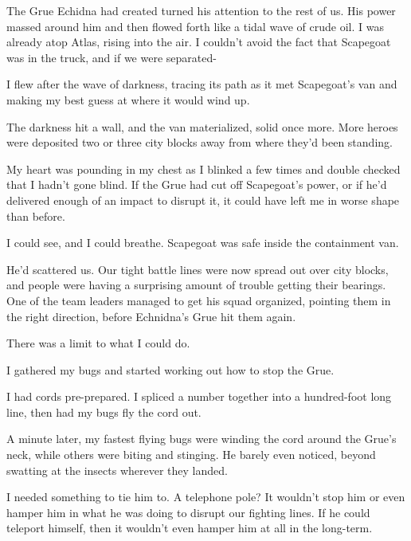 





The Grue Echidna had created turned his attention to the rest of us.  His power massed around him and then flowed forth like a tidal wave of crude oil.  I was already atop Atlas, rising into the air.  I couldn't avoid the fact that Scapegoat was in the truck, and if we were separated-



I flew after the wave of darkness, tracing its path as it met Scapegoat's van and making my best guess at where it would wind up.



The darkness hit a wall, and the van materialized, solid once more.  More heroes were deposited two or three city blocks away from where they'd been standing.



My heart was pounding in my chest as I blinked a few times and double checked that I hadn't gone blind.  If the Grue had cut off Scapegoat's power, or if he'd delivered enough of an impact to disrupt it, it could have left me in worse shape than before.



I could see, and I could breathe.  Scapegoat was safe inside the containment van.



He'd scattered us.  Our tight battle lines were now spread out over city blocks, and people were having a surprising amount of trouble getting their bearings.  One of the team leaders managed to get his squad organized, pointing them in the right direction, before Echnidna's Grue hit them again.



There was a limit to what I could do.



I gathered my bugs and started working out how to stop the Grue.



I had cords pre-prepared.  I spliced a number together into a hundred-foot long line, then had my bugs fly the cord out.



A minute later, my fastest flying bugs were winding the cord around the Grue's neck, while others were biting and stinging.  He barely even noticed, beyond swatting at the insects wherever they landed.



I needed something to tie him to.  A telephone pole?  It wouldn't stop him or even hamper him in what he was doing to disrupt our fighting lines.  If he could teleport himself, then it wouldn't even hamper him at all in the long-term.



